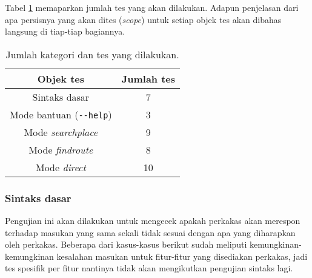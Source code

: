 Tabel \ref{tab:testing-experiments-testing-overview} memaparkan jumlah tes yang akan dilakukan. Adapun penjelasan dari apa persisnya yang akan dites (\textit{scope}) untuk setiap objek tes akan dibahas langsung di tiap-tiap bagiannya.

\begin{table}[H]
    \centering
    \begin{tabular}{| c | c |}
    \hline
        \textbf{Objek tes} & \textbf{Jumlah tes} \\
    \hline
    \hline
        Sintaks dasar & 7 \\
    \hline
        Mode bantuan (\verb|--help|) & 3 \\
    \hline
        Mode \textit{searchplace} & 9 \\
    \hline
        Mode \textit{findroute} & 8 \\
    \hline
        Mode \textit{direct} & 10 \\
    \hline
	\end{tabular}
    \caption{Jumlah kategori dan tes yang dilakukan.}
    \label{tab:testing-experiments-testing-overview}
\end{table}

\subsubsection{Sintaks dasar}
\label{sec:testing-experiments-testing-basic}

Pengujian ini akan dilakukan untuk mengecek apakah perkakas akan merespon terhadap masukan yang sama sekali tidak sesuai dengan apa yang diharapkan oleh perkakas. Beberapa dari kasus-kasus berikut sudah meliputi kemungkinan-kemungkinan kesalahan masukan untuk fitur-fitur yang disediakan perkakas, jadi tes spesifik per fitur nantinya tidak akan mengikutkan pengujian sintaks lagi.

